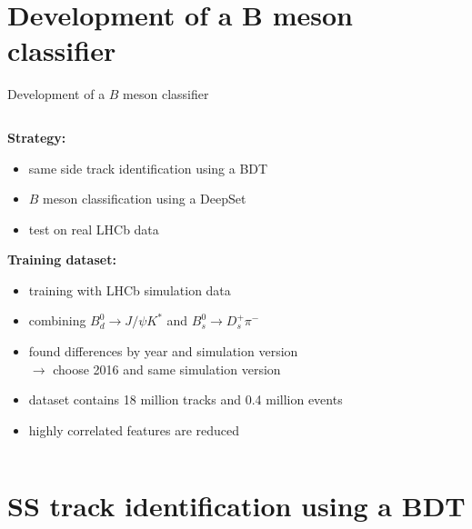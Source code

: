 \documentclass[aspectratio=1610, 10pt]{beamer}
\begin{document}
\section*{Development of a B meson classifier}

\begin{frame}{Development of a $B$ meson classifier}
  \centering
  \begin{columns}
    \begin{column}{0.6\textwidth}
      \textbf{Strategy:}
      \begin{itemize}
        \item same side track identification using a BDT
        \item $B$ meson classification using a DeepSet
        \item test on real LHCb data
      \end{itemize}

      \pause
      \textbf{Training dataset:}
      \begin{itemize}
        \item training with LHCb simulation data
        \item combining $B^0_d \rightarrow J/\psi K^*$ and $B^0_s \rightarrow D_s^+ \pi^-$
        \item found differences by year and simulation version \\$\rightarrow$ choose 2016 and same simulation version
        \item dataset contains 18 million tracks and 0.4 million events
        \item highly correlated features are reduced 
      \end{itemize}
    \end{column}
  \end{columns}
\end{frame}

\section*{SS track identification using a BDT}
\end{document}
